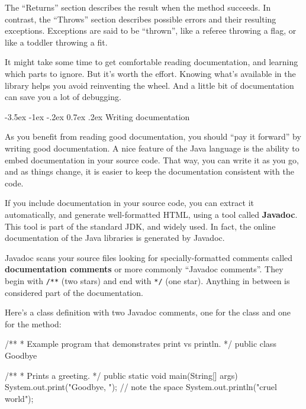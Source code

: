 \documentclass[12pt]{book}
\makeatletter
\theoremstyle{exercise}
\newcommand{\java}[1]{\verb"#1"}
\renewcommand{\section}{\@startsection{section}{1}{\z@}%
    {-3.5ex \@plus -1ex \@minus -.2ex}%
    {0.7ex \@plus.2ex}%
    {\normalfont\Large\bfseries}}
\newcommand{\java}[1]{\lstinline{#1}} %
\makeatother
\begin{document}
The ``Returns'' section describes the result when the method succeeds.
In contrast, the ``Throws'' section describes possible errors and their resulting exceptions.
Exceptions are said to be ``thrown'', like a referee throwing a flag, or like a toddler throwing a fit.

It might take some time to get comfortable reading documentation, and learning which parts to ignore.
But it's worth the effort.
Knowing what's available in the library helps you avoid reinventing the wheel.
And a little bit of documentation can save you a lot of debugging.


\section{Writing documentation}


As you benefit from reading good documentation, you should ``pay it forward'' by writing good documentation.
A nice feature of the Java language is the ability to embed documentation in your source code.
That way, you can write it as you go, and as things change, it is easier to keep the documentation consistent with the code.

If you include documentation in your source code, you can extract it automatically, and generate well-formatted HTML, using a tool called {\bf Javadoc}.
This tool is part of the standard JDK, and widely used.
In fact, the online documentation of the Java libraries is generated by Javadoc.


Javadoc scans your source files looking for specially-formatted comments called {\bf documentation comments} or more commonly ``Javadoc comments''.
They begin with \java{/**} (two stars) and end with \java{*/} (one star).
Anything in between is considered part of the documentation.

Here's a class definition with two Javadoc comments, one for the class and one for the method:

\begin{code}
/**
 * Example program that demonstrates print vs println.
 */
public class Goodbye {

    /**
     * Prints a greeting.
     */
    public static void main(String[] args) {
        System.out.print("Goodbye, ");  // note the space
        System.out.println("cruel world");
    }

}
\end{code}
\end{document}
